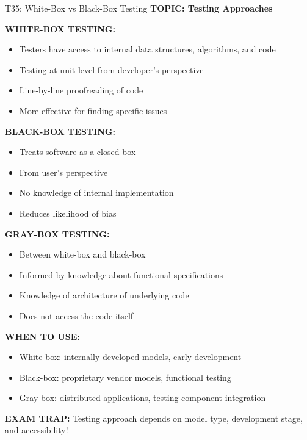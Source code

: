 \documentclass[8pt]{beamer}
\begin{document}
	\begin{frame}{T35: White-Box vs Black-Box Testing}
		\fontsize{6.5}{7.5}\selectfont
		\textbf{TOPIC: Testing Approaches}
		
		\vspace{0.1cm}
		\textbf{WHITE-BOX TESTING:}
		\begin{itemize}
			\item Testers have access to internal data structures, algorithms, and code
			\item Testing at unit level from developer's perspective
			\item Line-by-line proofreading of code
			\item More effective for finding specific issues
		\end{itemize}
		
		\vspace{0.1cm}
		\textbf{BLACK-BOX TESTING:}
		\begin{itemize}
			\item Treats software as a closed box
			\item From user's perspective
			\item No knowledge of internal implementation
			\item Reduces likelihood of bias
		\end{itemize}
		
		\vspace{0.1cm}
		\textbf{GRAY-BOX TESTING:}
		\begin{itemize}
			\item Between white-box and black-box
			\item Informed by knowledge about functional specifications
			\item Knowledge of architecture of underlying code
			\item Does not access the code itself
		\end{itemize}
		
		\vspace{0.1cm}
		\textbf{WHEN TO USE:}
		\begin{itemize}
			\item White-box: internally developed models, early development
			\item Black-box: proprietary vendor models, functional testing
			\item Gray-box: distributed applications, testing component integration
		\end{itemize}
		
		\textcolor{myred}{\textbf{EXAM TRAP:}} Testing approach depends on \textcolor{myblue}{model type, development stage, and accessibility}!
	\end{frame}
	
\end{document}
